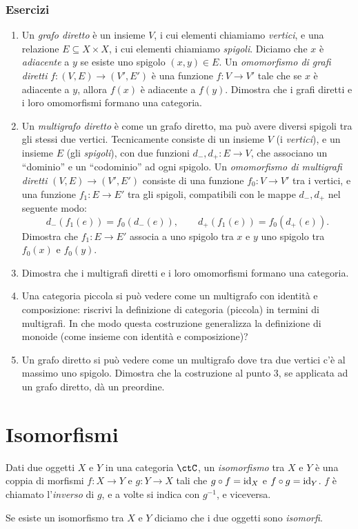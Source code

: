 \subsubsection*{Esercizi}
\begin{enumerate}
    \item Un \emph{grafo diretto} è un insieme $V$, i cui elementi chiamiamo \emph{vertici}, e una relazione $E\subseteq X\times X$, i cui elementi chiamiamo \emph{spigoli}. Diciamo che $x$ è \emph{adiacente} a $y$ se esiste uno spigolo $(x,y)\in E$. Un \emph{omomorfismo di grafi diretti} $f:(V,E)\to (V',E')$ è una funzione $f:V\to V'$ tale che se $x$ è adiacente a $y$, allora $f(x)$ è adiacente a $f(y)$. Dimostra che i grafi diretti e i loro omomorfismi formano una categoria. 
    \item Un \emph{multigrafo diretto} è come un grafo diretto, ma può avere diversi spigoli tra gli stessi due vertici. Tecnicamente consiste di un insieme $V$ (i \emph{vertici}), e un insieme $E$ (gli \emph{spigoli}), con due funzioni $d_-,d_+:E\to V$, che associano un ``dominio'' e un ``codominio'' ad ogni spigolo. Un \emph{omomorfismo di multigrafi diretti} $(V,E)\to (V',E')$ consiste di una funzione $f_0:V\to V'$ tra i vertici, e una funzione $f_1:E\to E'$ tra gli spigoli, compatibili con le mappe $d_-,d_+$ nel seguente modo:
    $$
    d_-(f_1(e)) = f_0(d_-(e)) ,\qquad d_+(f_1(e)) = f_0(d_+(e)) .
    $$
    Dimostra che $f_1:E\to E'$ associa a uno spigolo tra $x$ e $y$ uno spigolo tra $f_0(x)$ e $f_0(y)$. 
    \item Dimostra che i multigrafi diretti e i loro omomorfismi formano una categoria. 
    \item Una categoria piccola si può vedere come un multigrafo con identità e composizione: riscrivi la definizione di categoria (piccola) in termini di multigrafi.  In che modo questa costruzione generalizza la definizione di monoide (come insieme con identità e composizione)?
    \item Un grafo diretto si può vedere come un multigrafo dove tra due vertici c'è al massimo uno spigolo. Dimostra che la costruzione al punto 3, se applicata ad un grafo diretto, dà un preordine. 
\end{enumerate}


\section{Isomorfismi}\label{isomorfismi}

\begin{definition}
 Dati due oggetti $X$ e $Y$ in una categoria $\ctC$, un \emph{isomorfismo} tra $X$ e $Y$ è una coppia di morfismi $f:X\to Y$ e $g:Y\to X$ tali che $g\circ f=\mathrm{id}_X$ e $f\circ g=\mathrm{id}_Y$. 
 $f$ è chiamato l'\emph{inverso} di $g$, e a volte si indica con $g^{-1}$, e viceversa.
 
 Se esiste un isomorfismo tra $X$ e $Y$ diciamo che i due oggetti sono \emph{isomorfi}.
\end{definition}

